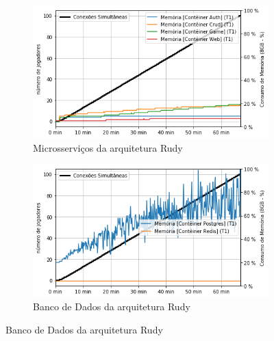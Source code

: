 \begin{figure}[htb!]
    \caption{Consumo de memória das arquiteturas}
    \label{fig:experimento_mem}

    \begin{subfigure}{.5\textwidth}
        \centering
        \includegraphics[width=.95\linewidth]{figuras/testes/r_mem_game.png}
        \caption{Microsserviços da arquitetura Rudy}
        \label{fig:r_mem_game}
    \end{subfigure}%
    \begin{subfigure}{.5\textwidth}
        \centering
        \includegraphics[width=.95\linewidth]{figuras/testes/r_mem_db.png}
        \caption{Banco de Dados da arquitetura Rudy}
        \label{fig:r_mem_db}
    \end{subfigure}%


\end{figure}

